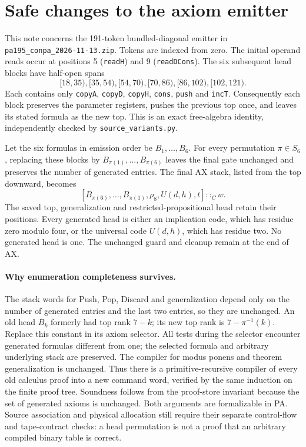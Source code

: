 \section{Safe changes to the axiom emitter}
\label{app:logical-experiments}

This note concerns the 191-token bundled-diagonal emitter in
\texttt{pa195\_conpa\_2026-11-13.zip}. Tokens are indexed from zero.
The initial operand reads occur at positions 5 (\texttt{readH}) and 9
(\texttt{readDCons}). The six subsequent head blocks have half-open spans
\[
 [18,35),[35,54),[54,70),[70,86),[86,102),[102,121).
\]
Each contains only \texttt{copyA}, \texttt{copyD}, \texttt{copyH},
\texttt{cons}, \texttt{push} and \texttt{incT}. Consequently each block
preserves the parameter registers, pushes the previous top once, and
leaves its stated formula as the new top. This is an exact free-algebra
identity, independently checked by \texttt{source\_variants.py}.

Let the six formulas in emission order be $B_1,\ldots,B_6$.
For every permutation $\pi\in S_6$, replacing these blocks by
$B_{\pi(1)},\ldots,B_{\pi(6)}$ leaves the final gate unchanged and
preserves the number of generated entries. The final AX stack, listed
from the top downward, becomes
\[
 [B_{\pi(6)},\ldots,B_{\pi(1)},\rho_8,U(d,h),t]::_Cw.
\]
The saved top, generalization and restricted-propositional head retain
their positions. Every generated head is either an implication code,
which has residue zero modulo four, or the universal code $U(d,h)$,
which has residue two. No generated head is one. The unchanged guard
and cleanup remain at the end of AX.

\paragraph{Why enumeration completeness survives.}
The stack words for Push, Pop, Discard and generalization depend only on
the number of generated entries and the last two entries, so they are
unchanged. An old head $B_k$ formerly had top rank $7-k$; its new top
rank is $7-\pi^{-1}(k)$. Replace this constant in its axiom selector.
All tests during the selector encounter generated formulas different
from one; the selected formula and arbitrary underlying stack are
preserved. The compiler for modus ponens and theorem generalization is
unchanged. Thus there is a primitive-recursive compiler of every old
calculus proof into a new command word, verified by the same induction
on the finite proof tree. Soundness follows from the proof-store
invariant because the set of generated axioms is unchanged. Both
arguments are formalizable in PA. Source association and physical
allocation still require their separate control-flow and tape-contract
checks: a head permutation is not a proof that an arbitrary compiled
binary table is correct.

